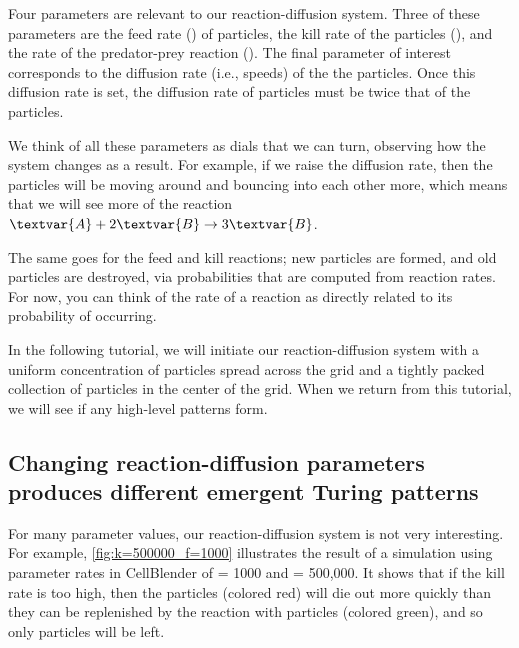 Four parameters are relevant to our reaction-diffusion system. Three of these parameters are the feed rate () of  particles, the kill rate of the  particles (), and the rate of the predator-prey reaction (). The final parameter of interest corresponds to the diffusion rate (i.e., speeds) of the the  particles. Once this diffusion rate is set, the diffusion rate of  particles must be twice that of the  particles.

We think of all these parameters as dials that we can turn, observing how the system changes as a result. For example, if we raise the diffusion rate, then the particles will be moving around and bouncing into each other more, which means that we will see more of the reaction $\textvar{A} + 2\textvar{B} \rightarrow 3\textvar{B}$.\\

\begin{qbox}\end{qbox}

The same goes for the feed and kill reactions; new  particles are formed, and old  particles are destroyed, via probabilities that are computed from reaction rates. For now, you can think of the rate of a reaction as directly related to its probability of occurring.

In the following tutorial, we will initiate our reaction-diffusion system with a uniform concentration of  particles spread across the grid and a tightly packed collection of  particles in the center of the grid. When we return from this tutorial, we will see if any high-level patterns form.


\FloatBarrier
{}
\subsection{Changing reaction-diffusion parameters produces different emergent Turing patterns}

For many parameter values, our reaction-diffusion system is not very interesting.  For example, \autoref{fig:k=500000_f=1000} illustrates the result of a simulation using parameter rates in CellBlender of  = 1000 and  = 500,000.  It shows that if the kill rate is too high, then the  particles (colored red) will die out more quickly than they can be replenished by the reaction with  particles (colored green), and so only  particles will be left.\\

